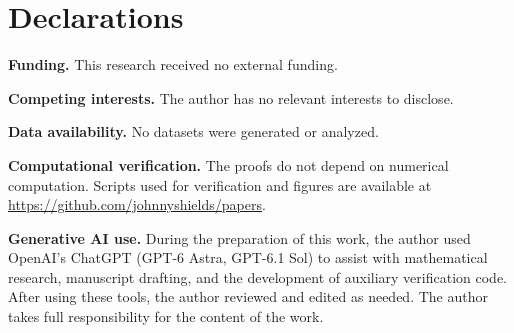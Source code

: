 \documentclass[11pt,a4paper]{amsart}
\numberwithin{equation}{section}
\theoremstyle{plain}
\theoremstyle{definition}
\begin{document}
\section*{Declarations}
{\footnotesize
\noindent\textbf{Funding.} This research received no external funding.

\smallskip
\noindent\textbf{Competing interests.} The author has no relevant interests to disclose.

\smallskip
\noindent\textbf{Data availability.} No datasets were generated or analyzed.

\smallskip
\noindent\textbf{Computational verification.} The proofs do not depend on numerical computation.  Scripts used for verification and figures are available at \url{https://github.com/johnnyshields/papers}.

\smallskip
\noindent\textbf{Generative AI use.} During the preparation of this work, the author used OpenAI's ChatGPT (GPT-6 Astra, GPT-6.1 Sol) to assist with mathematical research, manuscript drafting, and the development of auxiliary verification code.  After using these tools, the author reviewed and edited as needed.  The author takes full responsibility for the content of the work.\par}
\end{document}
